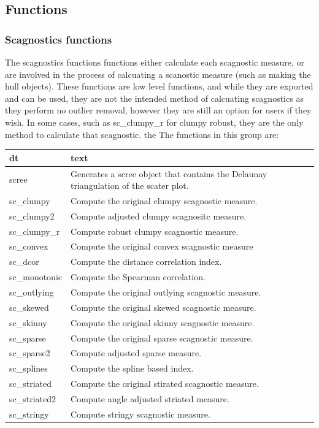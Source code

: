 \hypertarget{functions}{%
\subsection{Functions}\label{functions}}

\hypertarget{scagnostics-functions}{%
\subsubsection{Scagnostics functions}\label{scagnostics-functions}}

The scagnostics functions functions either calculate each scagnostic
measure, or are involved in the process of calcuating a scanostic
measure (such as making the hull objects). These functions are low level
functions, and while they are exported and can be used, they are not the
intended method of calcuating scagnostics as they perform no outlier
removal, however they are still an option for users if they wish. In
some cases, such as sc\_clumpy\_r for clumpy robust, they are the only
method to calculate that scagnostic. the The functions in this group
are:

\begin{Schunk}

\begin{tabular}{l|l}
\hline
dt & text\\
\hline
scree & Generates a scree object that contains the Delaunay triangulation of the scater plot.\\
\hline
sc\_clumpy & Compute the original clumpy scagnostic measure.\\
\hline
sc\_clumpy2 & Compute adjusted clumpy scagnositc measure.\\
\hline
sc\_clumpy\_r & Compute robust clumpy scagnostic measure.\\
\hline
sc\_convex & Compute the original convex scagnostic measure\\
\hline
sc\_dcor & Compute the distance correlation index.\\
\hline
sc\_monotonic & Compute the Spearman correlation.\\
\hline
sc\_outlying & Compute the original outlying scagnostic measure.\\
\hline
sc\_skewed & Compute the original skewed scagnostic measure.\\
\hline
sc\_skinny & Compute the original skinny scagnostic measure.\\
\hline
sc\_sparse & Compute the original sparse scagnostic measure.\\
\hline
sc\_sparse2 & Compute adjusted sparse measure.\\
\hline
sc\_splines & Compute the spline based index.\\
\hline
sc\_striated & Compute the original stirated scagnostic measure.\\
\hline
sc\_striated2 & Compute angle adjusted striated measure.\\
\hline
sc\_stringy & Compute stringy scagnostic measure.\\
\hline
\end{tabular}

\end{Schunk}

